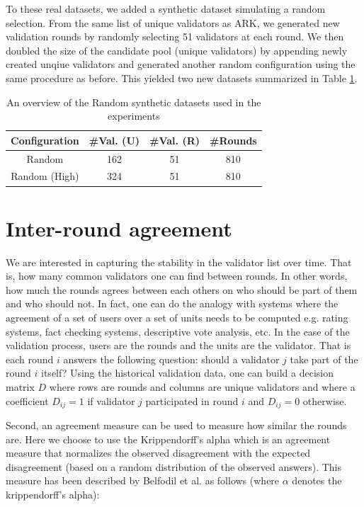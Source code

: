 \documentclass{article}
\begin{document}
To these real datasets, we added a synthetic dataset simulating a random selection. From the same list of unique validators as ARK, we generated new validation rounds by randomly selecting 51 validators at each round. We then doubled the size of the candidate pool (unique validators) by appending newly created unqiue validators and generated another random configuration using the same procedure as before. This yielded two new datasets summarized in Table \ref{tab:dataR}.

\begin{table}[]
\centering
 \begin{tabular}{|c c c c|}
 \hline
 Configuration & \#Val. (U) & \#Val. (R) & \#Rounds   \\ [0.5ex]
 \hline\hline
 Random & 162 & 51 & 810 \\ [1ex]
 Random (High) & 324 & 51 & 810  \\ [1ex]
 \hline
 \end{tabular}

 \caption{An overview of the Random synthetic datasets used in the experiments}
 \label{tab:dataR}
\end{table}

\section{Inter-round agreement}
\label{sec:agreement}
We are interested in capturing the stability in the validator list over time. That is, how many common validators one can find between rounds. In other words, how much the rounds agrees between each others on who should be part of them and who should not. In fact, one can do the analogy with systems where the agreement of a set of users over a set of units needs to be computed e.g. rating systems, fact checking systems, descriptive vote analysis, etc. In the case of the validation process, users are the rounds and the units are the validator. That is each round $i$ answers the following question: should a validator $j$ take part of the round $i$ itself? Using the historical validation data, one can build a decision matrix $D$ where rows are rounds and columns are unique validators and where a coefficient $D_{ij} = 1$ if validator $j$ participated in round $i$ and $D_{ij} =0$ otherwise.

Second, an agreement measure can be used to measure how similar the rounds are. Here we choose to use the Krippendorff's alpha \cite{krippendorff2018content} which is an agreement measure that normalizes the observed disagreement with the expected disagreement (based on a random distribution of the observed answers). This measure has been described by Belfodil et al. \cite{belfodil2019dEV} as follows (where $\alpha$ denotes the krippendorff's alpha):
\end{document}
